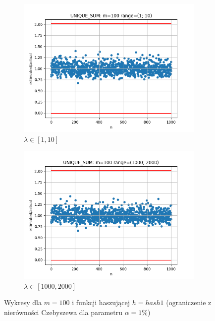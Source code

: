 \documentclass{article}
\begin{document}
\begin{figure}[H]
        \begin{subfigure}{0.6\textwidth}
            \centering
            \includegraphics[width=\linewidth]{sum/zad1_range_1_10_cheb_1.png}
            \caption{$\lambda \in [1, 10]$}
        \end{subfigure}
        \begin{subfigure}{0.6\textwidth}
            \centering
            \includegraphics[width=\linewidth]{sum/zad1_range_1000_2000_cheb_1.png}
            \caption{$\lambda \in [1000, 2000]$}
        \end{subfigure}
        \caption{Wykresy dla $m = 100$ i funkcji haszującej $h = hash1$ (ograniczenie z nierówności Czebyszewa dla parametru $\alpha = 1\%$)}
    \end{figure}
\end{document}

